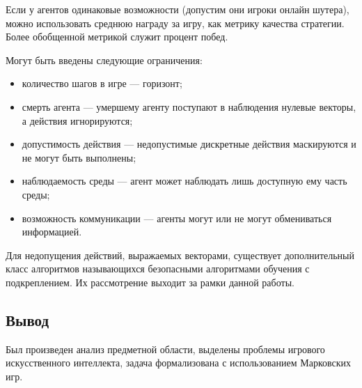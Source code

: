 Если у агентов одинаковые возможности (допустим они игроки онлайн шутера), можно использовать среднюю награду за игру, как метрику качества стратегии.
Более обобщенной метрикой служит процент побед. 

\pagebreak

Могут быть введены следующие ограничения:

\begin{itemize}[label=---]
	\item количество шагов в игре --- горизонт;
	\item смерть агента --- умершему агенту поступают в наблюдения нулевые векторы, а действия игнорируются;
	\item допустимость действия --- недопустимые дискретные действия маскируются и не могут быть выполнены;
	\item наблюдаемость среды --- агент может наблюдать лишь доступную ему часть среды;
	\item возможность коммуникации --- агенты могут или не могут обмениваться информацией.
\end{itemize}


Для недопущения действий, выражаемых векторами, существует дополнительный класс алгоритмов называющихся
безопасными алгоритмами обучения с подкреплением. Их рассмотрение выходит за рамки данной работы.

\subsection*{Вывод}

Был произведен анализ предметной области, выделены проблемы игрового искусственного интеллекта, задача формализована с использованием Марковских игр.